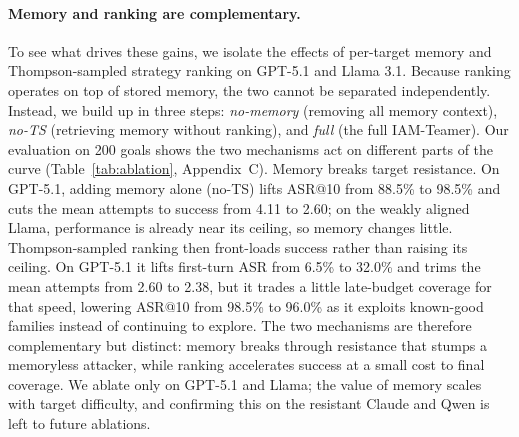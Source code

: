 \documentclass[a4paper,fleqn]{cas-sc}
\begin{document}
\paragraph{Memory and ranking are complementary.}
To see what drives these gains, we isolate the effects of per-target memory and Thompson-sampled strategy ranking on GPT-5.1 and Llama 3.1.
Because ranking operates on top of stored memory, the two cannot be separated independently.
Instead, we build up in three steps: \emph{no-memory} (removing all memory context), \emph{no-TS} (retrieving memory without ranking), and \emph{full} (the full IAM-Teamer).
Our evaluation on 200 goals shows the two mechanisms act on different parts of the curve (Table~\ref{tab:ablation}, Appendix~C).
Memory breaks target resistance. On GPT-5.1, adding memory alone (no-TS) lifts ASR@10 from 88.5\% to 98.5\% and cuts the mean attempts to success from 4.11 to 2.60; on the weakly aligned Llama, performance is already near its ceiling, so memory changes little.
Thompson-sampled ranking then front-loads success rather than raising its ceiling. On GPT-5.1 it lifts first-turn ASR from 6.5\% to 32.0\% and trims the mean attempts from 2.60 to 2.38, but it trades a little late-budget coverage for that speed, lowering ASR@10 from 98.5\% to 96.0\% as it exploits known-good families instead of continuing to explore.
The two mechanisms are therefore complementary but distinct: memory breaks through resistance that stumps a memoryless attacker, while ranking accelerates success at a small cost to final coverage.
We ablate only on GPT-5.1 and Llama; the value of memory scales with target difficulty, and confirming this on the resistant Claude and Qwen is left to future ablations.
\end{document}
